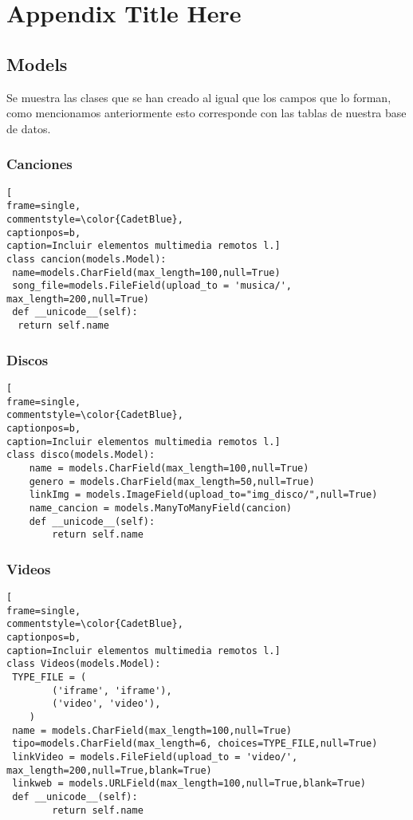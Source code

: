
\chapter{Appendix Title Here} %

\label{AppendixX} %

\section{Models}
Se muestra las clases que se han creado al igual que los campos que lo forman, como mencionamos anteriormente esto corresponde con las tablas de nuestra base de datos.
\subsection{Canciones}
\begin{lstlisting}[
frame=single,
commentstyle=\color{CadetBlue},
captionpos=b,
caption=Incluir elementos multimedia remotos l.]
class cancion(models.Model):
 name=models.CharField(max_length=100,null=True)
 song_file=models.FileField(upload_to = 'musica/', max_length=200,null=True)
 def __unicode__(self):
  return self.name
\end{lstlisting}

\subsection{Discos}
\begin{lstlisting}[
frame=single,
commentstyle=\color{CadetBlue},
captionpos=b,
caption=Incluir elementos multimedia remotos l.]
class disco(models.Model):
	name = models.CharField(max_length=100,null=True)
	genero = models.CharField(max_length=50,null=True)
	linkImg = models.ImageField(upload_to="img_disco/",null=True)
	name_cancion = models.ManyToManyField(cancion)
	def __unicode__(self):
		return self.name
\end{lstlisting}

\subsection{Videos}
\begin{lstlisting}[
frame=single,
commentstyle=\color{CadetBlue},
captionpos=b,
caption=Incluir elementos multimedia remotos l.]
class Videos(models.Model):
 TYPE_FILE = (
        ('iframe', 'iframe'),
        ('video', 'video'),
    )
 name = models.CharField(max_length=100,null=True)
 tipo=models.CharField(max_length=6, choices=TYPE_FILE,null=True)
 linkVideo = models.FileField(upload_to = 'video/', max_length=200,null=True,blank=True)
 linkweb = models.URLField(max_length=100,null=True,blank=True)
 def __unicode__(self):
		return self.name
\end{lstlisting}

